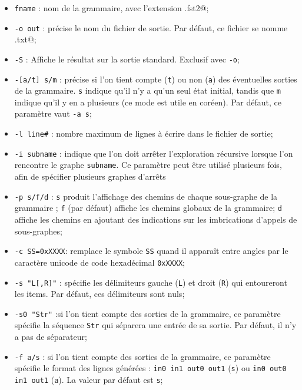 \begin{itemize}
  \item \verb$fname$ : nom de la grammaire, avec l’extension \verb@.fst2@;
  \item \verb$-o out$ : précise le nom du fichier de sortie. Par défaut, ce fichier se nomme
  	  \verb@lst.txt@;
  \item \verb$-S$ : Affiche le résultat sur la sortie standard. Exclusif avec \verb$-o$;
  \item \verb$-[a/t] s/m$ : précise si l’on tient compte (\verb$t$) ou non (\verb$a$) des
  	 éventuelles sorties de la grammaire. \verb$s$ indique qu’il n’y a qu’un seul état initial,
  	 tandis que \verb$m$ indique qu’il y en a plusieurs (ce mode est utile en coréen). 
  	 Par défaut, ce paramètre vaut \verb$-a s$;

  \item \verb$-l line#$ : nombre maximum de lignes à écrire dans le fichier de sortie;
  \item \verb$-i subname$ : indique que l’on doit arrêter l’exploration récursive lorsque l’on
   rencontre le graphe \verb$subname$. Ce paramètre peut être utilisé plusieurs fois, afin
   de spécifier plusieurs graphes d’arrêts

  \item \verb$-p s/f/d$ : \verb$s$ produit l’affichage des chemins de chaque sous-graphe de la
  	  grammaire ; \verb$f$ (par défaut) affiche les chemins globaux de la grammaire; \verb$d$ affiche les chemins en ajoutant des indications sur les imbrications d’appels de sous-graphes;

  \item \verb$-c SS=0xXXXX$: remplace le symbole \verb$SS$ quand il apparaît entre angles par
  le caractère unicode de code hexadécimal \verb$0xXXXX$;

  \item \verb$-s "L[,R]"$ : spécifie les délimiteurs gauche (\verb$L$) et droit (\verb$R$)
  qui entoureront les items. Par défaut, ces délimiteurs sont nuls;

  \item \verb$-s0 "Str"$ :si l’on tient compte des sorties de la grammaire, ce paramètre spécifie la
   séquence \verb$Str$ qui séparera une entrée de sa sortie. Par défaut, il n’y a pas de séparateur;

  \item \verb$-f a/s$ : si l’on tient compte des sorties de la grammaire, ce paramètre spécifie le
  format des lignes générées :
  \verb$in0 in1 out0 out1$ (\verb$s$) ou \verb$in0 out0 in1 out1$ (\verb$a$). La valeur par défaut
  est \verb$s$;
  

\end{itemize}
